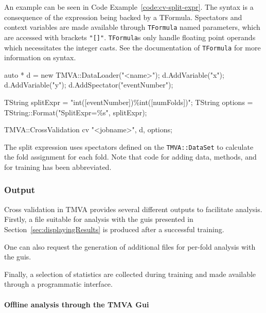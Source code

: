 An example can be seen in Code Example~\ref{code:cv-split-expr}. The syntax is a consequence of the expression being backed by a TFormula. Spectators and context variables are made available through \texttt{TFormula} named parameters, which are accessed with brackets \texttt{"[]"}. \texttt{TFormula}s only handle floating point operands which necessitates the integer casts. See the documentation of \texttt{TFormula} for more information on syntax.

\begin{codeexample}
\begin{tmvacode}
auto * d = new TMVA::DataLoader("<name>");
d.AddVariable("x");
d.AddVariable("y");
d.AddSpectator("eventNumber");

TString splitExpr = "int([eventNumber])\%int([numFolds])";
TString options = TString::Format("SplitExpr=\%s", splitExpr);

TMVA::CrossValidation cv {"<jobname>", d, options};
\end{tmvacode}
\caption[.]{\codeexampleCaptionSize The split expression uses spectators defined on the \texttt{TMVA::DataSet} to calculate the fold assignment for each fold. Note that code for adding data, methods, and for training has been abbreviated.
}
\label{code:cv-split-expr}
\end{codeexample}










\subsubsection{Output}
\label{sec:cv-output}
Cross validation in TMVA provides several different outputs to facilitate analysis. Firstly, a file suitable for analysis with the guis presented in Section~\ref{sec:displayingResults} is produced after a successful training.

One can also request the generation of additional files for per-fold analysis with the guis.

Finally, a selection of statistics are collected during training and made available through a programmatic interface.

\paragraph{Offline analysis through the TMVA Gui}
\label{sec:cv-output-files}

